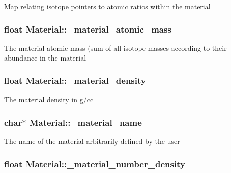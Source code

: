 Map relating isotope pointers to atomic ratios within the material \hypertarget{classMaterial_aa34fea9db30d4154bd405266452997d7}{
\subsubsection[{\-\_\-material\-\_\-atomic\-\_\-mass}]{\setlength{\rightskip}{0pt plus 5cm}float Material\-::\-\_\-material\-\_\-atomic\-\_\-mass\hspace{0.3cm}{\ttfamily [private]}}}\label{classMaterial_aa34fea9db30d4154bd405266452997d7}
The material atomic mass (sum of all isotope masses according to their abundance in the material \hypertarget{classMaterial_a43b7af8a6d0db91f87ba6fc4bc444296}{
\subsubsection[{\-\_\-material\-\_\-density}]{\setlength{\rightskip}{0pt plus 5cm}float Material\-::\-\_\-material\-\_\-density\hspace{0.3cm}{\ttfamily [private]}}}\label{classMaterial_a43b7af8a6d0db91f87ba6fc4bc444296}
The material density in g/cc \hypertarget{classMaterial_a5fae14afcfee32144bea316d57ffaa91}{
\subsubsection[{\-\_\-material\-\_\-name}]{\setlength{\rightskip}{0pt plus 5cm}char$\ast$ Material\-::\-\_\-material\-\_\-name\hspace{0.3cm}{\ttfamily [private]}}}\label{classMaterial_a5fae14afcfee32144bea316d57ffaa91}
The name of the material arbitrarily defined by the user \hypertarget{classMaterial_ae8d6d883253ee2c7ac6b2ec30dcafcf3}{
\subsubsection[{\-\_\-material\-\_\-number\-\_\-density}]{\setlength{\rightskip}{0pt plus 5cm}float Material\-::\-\_\-material\-\_\-number\-\_\-density\hspace{0.3cm}{\ttfamily [private]}}}\label{classMaterial_ae8d6d883253ee2c7ac6b2ec30dcafcf3}

